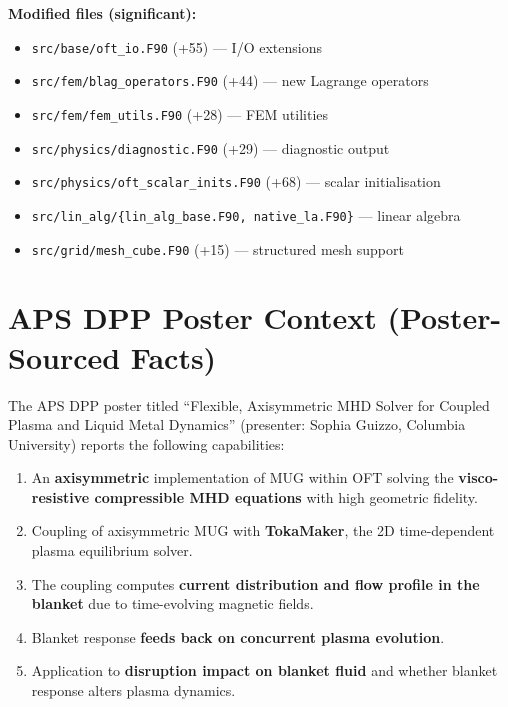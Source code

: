 \documentclass[11pt,letterpaper]{article}
\begin{document}
\textbf{Modified files (significant):}
\begin{itemize}
  \item \texttt{src/base/oft\_io.F90} (+55) --- I/O extensions
  \item \texttt{src/fem/blag\_operators.F90} (+44) --- new Lagrange operators
  \item \texttt{src/fem/fem\_utils.F90} (+28) --- FEM utilities
  \item \texttt{src/physics/diagnostic.F90} (+29) --- diagnostic output
  \item \texttt{src/physics/oft\_scalar\_inits.F90} (+68) --- scalar initialisation
  \item \texttt{src/lin\_alg/\{lin\_alg\_base.F90, native\_la.F90\}} --- linear algebra
  \item \texttt{src/grid/mesh\_cube.F90} (+15) --- structured mesh support
\end{itemize}

\section{APS DPP Poster Context (Poster-Sourced Facts)}

The APS DPP poster titled ``Flexible, Axisymmetric MHD Solver for Coupled
Plasma and Liquid Metal Dynamics'' (presenter: Sophia Guizzo, Columbia
University) reports the following capabilities:

\begin{enumerate}
  \item An \textbf{axisymmetric} implementation of MUG within OFT solving the
    \textbf{visco-resistive compressible MHD equations} with high geometric
    fidelity.
  \item Coupling of axisymmetric MUG with \textbf{TokaMaker}, the 2D
    time-dependent plasma equilibrium solver.
  \item The coupling computes \textbf{current distribution and flow profile in
    the blanket} due to time-evolving magnetic fields.
  \item Blanket response \textbf{feeds back on concurrent plasma evolution}.
  \item Application to \textbf{disruption impact on blanket fluid} and whether
    blanket response alters plasma dynamics.
\end{enumerate}
\end{document}
